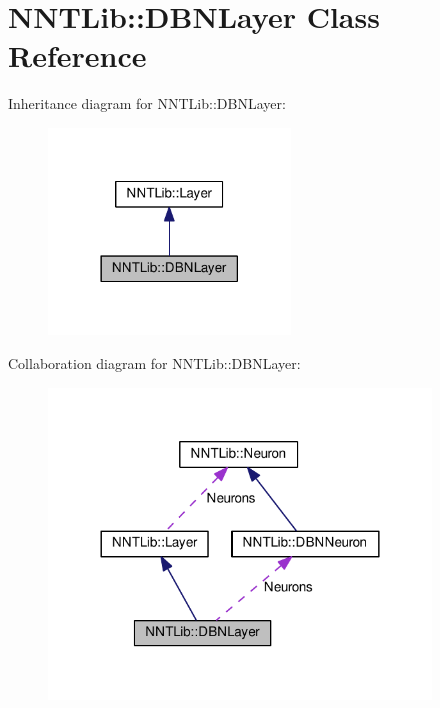 \hypertarget{class_n_n_t_lib_1_1_d_b_n_layer}{}\section{N\+N\+T\+Lib\+:\+:D\+B\+N\+Layer Class Reference}
\label{class_n_n_t_lib_1_1_d_b_n_layer}


Inheritance diagram for N\+N\+T\+Lib\+:\+:D\+B\+N\+Layer\+:\nopagebreak
\begin{figure}[H]
\begin{center}
\leavevmode
\includegraphics[width=182pt]{class_n_n_t_lib_1_1_d_b_n_layer__inherit__graph}
\end{center}
\end{figure}


Collaboration diagram for N\+N\+T\+Lib\+:\+:D\+B\+N\+Layer\+:\nopagebreak
\begin{figure}[H]
\begin{center}
\leavevmode
\includegraphics[width=288pt]{class_n_n_t_lib_1_1_d_b_n_layer__coll__graph}
\end{center}
\end{figure}
